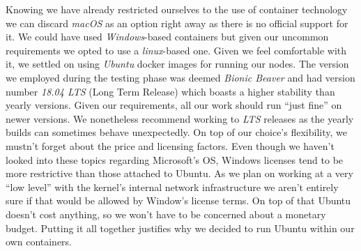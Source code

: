             Knowing we have already restricted ourselves to the use of container technology we can discard \textit{macOS} as an option right away as there is no official support for it. We could have used \textit{Windows}-based containers but given our uncommon requirements we opted to use a \textit{linux}-based one. Given we feel comfortable with it, we settled on using \textit{Ubuntu} docker images for running our nodes. The version we employed during the testing phase was deemed \textit{Bionic Beaver} and had version number \textit{18.04 LTS} (Long Term Release) which boasts a higher stability than yearly versions. Given our requirements, all our work should run ``just fine'' on newer versions. We nonetheless recommend working to \textit{LTS} releases as the yearly builds can sometimes behave unexpectedly. On top of our choice's flexibility, we mustn't forget about the price and licensing factors. Even though we haven't looked into these topics regarding Microsoft's OS, Windows licenses tend to be more restrictive than those attached to Ubuntu. As we plan on working at a very ``low level'' with the kernel's internal network infrastructure we aren't entirely sure if that would be allowed by Window's license terms. On top of that Ubuntu doesn't cost anything, so we won't have to be concerned about a monetary budget. Putting it all together justifies why we decided to run Ubuntu within our own containers.
